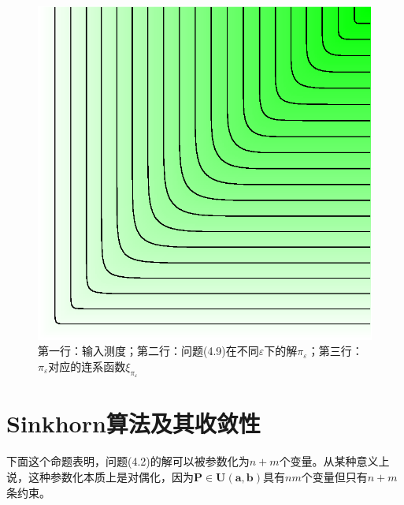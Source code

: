 \documentclass[cn,10pt,math=newtx,citestyle=gb7714-2015,bibstyle=gb7714-2015]{elegantbook}
\begin{document}
\begin{figure}[H]
\begin{minipage}{0.8\linewidth}
\begin{minipage}{0.19\linewidth}
\begin{mdframed}
		\end{mdframed}
		\caption*{$\varepsilon = 5\times 10^{-3}$}
	\end{minipage}
	\begin{minipage}{0.19\linewidth}
		\centering
		\begin{mdframed}
		    \includegraphics[width=\linewidth]{figure/fig4.4/evol-copula-50.eps}
		\end{mdframed}
		\caption*{$\varepsilon = 10^{-3}$}
	\end{minipage}
	
	\end{minipage}
	
	\vspace{1em}
	\caption{第一行：输入测度；第二行：问题(4.9)在不同$\varepsilon$下的解$\pi_\varepsilon$；第三行：$\pi_\varepsilon$对应的连系函数$\xi_{\pi_\varepsilon}$}
	\label{图4.4}
\end{figure}

\section{Sinkhorn算法及其收敛性}

下面这个命题表明，问题(4.2)的解可以被参数化为$n+m$个变量。从某种意义上说，这种参数化本质上是对偶化，因为$\mathbf{P}\in\mathbf{U(a,b)}$具有$nm$个变量但只有$n+m$条约束。
\end{document}
